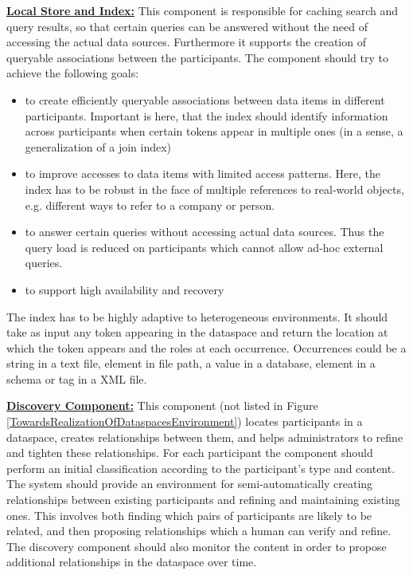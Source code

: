 \uline{\textbf{Local Store and Index:}} This component is responsible for caching search and query results, so that certain queries can be answered without the need of accessing the actual data sources. Furthermore it supports the creation of queryable associations between the participants. The component should try to achieve the following goals:
\begin{itemize}
\item to create efficiently queryable associations between data items in different participants. Important is here, that the index should identify information across participants when certain tokens appear in multiple ones (in a sense, a generalization of a join index)

\item to improve accesses to data items with limited access patterns. Here, the index has to be robust in the face of multiple references to real-world objects, e.g. different ways to refer to a company or person.

\item to answer certain queries without accessing actual data sources. Thus the query load is reduced on participants which cannot allow ad-hoc external queries. 
  
\item to support high availability and recovery   
\end{itemize}

The index has to be highly adaptive to heterogeneous environments. It should take as input any token appearing in the dataspace and return the location at which the token appears and the roles at each occurrence. Occurrences could be a string in a text file, element in file path, a value in a database, element in a schema or tag in a XML file. 

\uline{\textbf{Discovery Component:}} This component (not listed in Figure \ref{TowardsRealizationOfDataspacesEnvironment}) locates participants in a dataspace, creates relationships between them, and helps administrators to refine and tighten these relationships. For each participant the component should perform an initial classification according to the participant's type and content. The system should provide an environment for semi-automatically creating relationships between existing participants and refining and maintaining existing ones. This involves both finding which pairs of participants are likely to be related, and then proposing relationships which a human can verify and refine. The discovery component should also monitor the content in order to propose additional relationships in the dataspace over time.  

